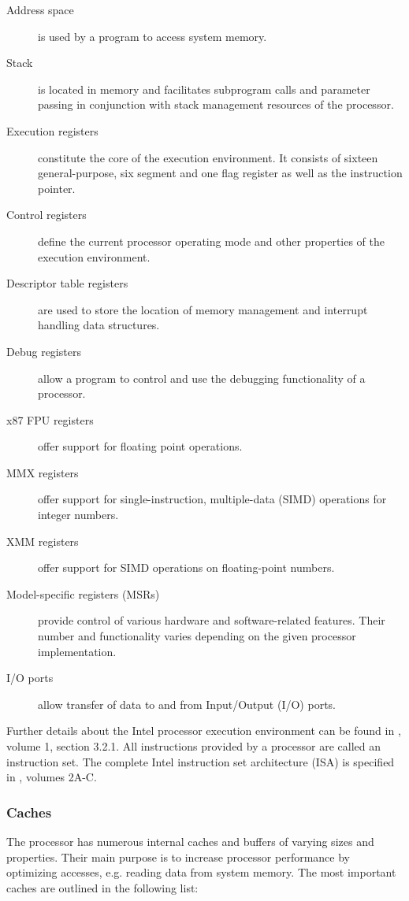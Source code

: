 \begin{description}
	\item[Address space] is used by a program to access system memory.
	\item[Stack] is located in memory and facilitates subprogram calls and
		parameter passing in conjunction with stack management resources of the
		processor.
	\item[Execution registers] constitute the core of the execution environment.
		It consists of sixteen general-purpose, six segment and one flag
		register as well as the instruction pointer.
	\item[Control registers] define the current processor operating mode and
		other properties of the execution environment.
	\item[Descriptor table registers] are used to store the location of memory
		management and interrupt handling data structures.
	\item[Debug registers] allow a program to control and use the debugging
		functionality of a processor.
	\item[x87 FPU registers] offer support for floating point operations.
	\item[MMX registers] offer support for single-instruction, multiple-data
		(SIMD) operations for integer numbers.
	\item[XMM registers] offer support for SIMD operations on floating-point
		numbers.
	\item[Model-specific registers (MSRs)] provide control of various hardware
		and software-related features. Their number and functionality varies
		depending on the given processor implementation.
	\item[I/O ports] allow transfer of data to and from Input/Output
		(I/O) ports.
\end{description}

Further details about the Intel processor execution environment can be found in
\cite{IntelSDM}, volume 1, section 3.2.1. All instructions provided by a
processor are called an instruction set. The complete Intel instruction set
architecture (ISA) is specified in \cite{IntelSDM}, volumes 2A-C.

\subsubsection{Caches}
The processor has numerous internal caches and buffers of varying sizes and
properties. Their main purpose is to increase processor performance by
optimizing accesses, e.g. reading data from system memory. The most important
caches are outlined in the following list:

